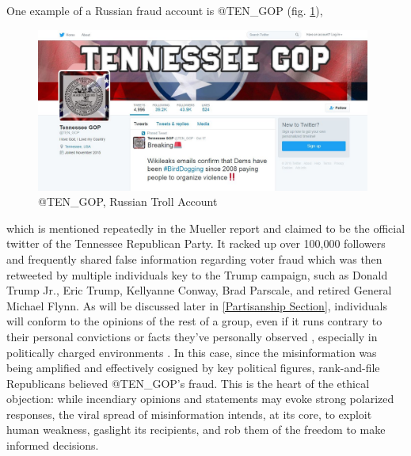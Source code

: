 \documentclass[preprint,review,12pt]{elsarticle}
\begin{document}
One example of a Russian fraud account is @TEN\_GOP (fig. \ref{fig:Russian Troll Account @TEN_GOP}), \begin{figure}[h]
    \centering
    \includegraphics[width=11cm]{Ten_GOP.jpeg}
    \caption{@TEN\_GOP, Russian Troll Account}
    \label{fig:Russian Troll Account @TEN_GOP}
\end{figure} which is mentioned repeatedly in the Mueller report and claimed to be the official twitter of the Tennessee Republican Party. It racked up over 100,000 followers and frequently shared false information regarding voter fraud which was then retweeted by multiple individuals key to the Trump campaign, such as Donald Trump Jr., Eric Trump, Kellyanne Conway, Brad Parscale, and retired General Michael Flynn. As will be discussed later in \ref{Partisanship Section}, individuals will conform to the opinions of the rest of a group, even if it runs contrary to their personal convictions or facts they've personally observed \cite{asch1956studies}, especially in politically charged environments \cite{bullock2007experiments,housholder2014facebook}. In this case, since the misinformation was being amplified and effectively cosigned by key political figures, rank-and-file Republicans believed @TEN\_GOP's fraud. This is the heart of the ethical objection: while incendiary opinions and statements may evoke strong polarized responses, 
the viral spread of misinformation intends, at its core, to exploit human weakness, gaslight its recipients, and rob them of the freedom to make informed decisions.
\end{document}
